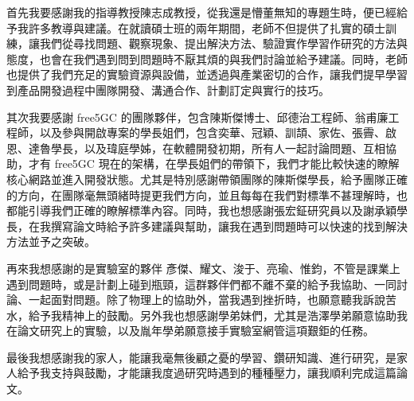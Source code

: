 \begin{acknowledgement}%

    首先我要感謝我的指導教授陳志成教授，從我還是懵董無知的專題生時，便已經給予我許多教導與建議。在就讀碩士班的兩年期間，老師不但提供了扎實的碩士訓練，讓我們從尋找問題、觀察現象、提出解決方法、驗證實作學習作研究的方法與態度，也會在我們遇到問到問題時不厭其煩的與我們討論並給予建議。同時，老師也提供了我們充足的實驗資源與設備，並透過與產業密切的合作，讓我們提早學習到產品開發過程中團隊開發、溝通合作、計劃訂定與實行的技巧。

    其次我要感謝 free5GC 的團隊夥伴，包含陳斯傑博士、邱德治工程師、翁甫廉工程師，以及參與開啟專案的學長姐們，包含奕華、冠穎、訓頡、家佐、張霽、啟恩、達魯學長，以及瑋庭學姊，在軟體開發初期，所有人一起討論問題、互相協助，才有 free5GC 現在的架構，在學長姐們的帶領下，我們才能比較快速的瞭解核心網路並進入開發狀態。尤其是特別感謝帶領團隊的陳斯傑學長，給予團隊正確的方向，在團隊毫無頭緒時提更我們方向，並且每每在我們對標準不甚理解時，也都能引導我們正確的瞭解標準內容。同時，我也想感謝張宏鉦研究員以及謝承穎學長，在我撰寫論文時給予許多建議與幫助，讓我在遇到問題時可以快速的找到解決方法並予之突破。

    再來我想感謝的是實驗室的夥伴 彥傑、耀文、浚于、亮瑜、惟鈞，不管是課業上遇到問題時，或是計劃上碰到瓶頸，這群夥伴們都不離不棄的給予我協助、一同討論、一起面對問題。除了物理上的協助外，當我遇到挫折時，也願意聽我訴說苦水，給予我精神上的鼓勵。另外我也想感謝學弟妹們，尤其是浩澤學弟願意協助我在論文研究上的實驗，以及胤年學弟願意接手實驗室網管這項艱鉅的任務。

    最後我想感謝我的家人，能讓我毫無後顧之憂的學習、鑽研知識、進行研究，是家人給予我支持與鼓勵，才能讓我度過研究時遇到的種種壓力，讓我順利完成這篇論文。

\end{acknowledgement}
